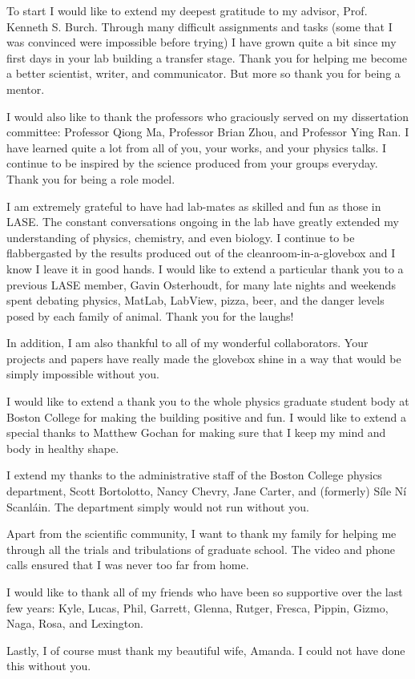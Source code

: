 To start I would like to extend my deepest gratitude to my advisor, Prof. Kenneth S. Burch. Through many difficult assignments and tasks (some that I was convinced were impossible before trying) I have grown quite a bit since my first days in your lab building a transfer stage. Thank you for helping me become a better scientist, writer, and communicator. But more so thank you for being a mentor. \par
I would also like to thank the professors who graciously served on my dissertation committee: Professor Qiong Ma, Professor Brian Zhou, and Professor Ying Ran. I have learned quite a lot from all of you, your works, and your physics talks. I continue to be inspired by the science produced from your groups everyday. Thank you for being a role model.\par
I am extremely grateful to have had lab-mates as skilled and fun as those in LASE. The constant conversations ongoing in the lab have greatly extended my understanding of physics, chemistry, and even biology. I continue to be flabbergasted by the results produced out of the cleanroom-in-a-glovebox and I know I leave it in good hands. I would like to extend a particular thank you to a previous LASE member, Gavin Osterhoudt, for many late nights and weekends spent debating physics, MatLab, LabView, pizza, beer, and the danger levels posed by each family of animal. Thank you for the laughs!\par
In addition, I am also thankful to all of my wonderful collaborators. Your projects and papers have really made the glovebox shine in a way that would be simply impossible without you. \par
I would like to extend a thank you to the whole physics graduate student body at Boston College for making the building positive and fun. I would like to extend a special thanks to Matthew Gochan for making sure that I keep my mind and body in healthy shape. \par
I extend my thanks to the administrative staff of the Boston College physics department, Scott Bortolotto, Nancy Chevry, Jane Carter, and (formerly) S\'{i}le N\'{i} Scanl\'{a}in. The department simply would not run without you.\par
Apart from the scientific community, I want to thank my family for helping me through all the trials and tribulations of graduate school. The video and phone calls ensured that I was never too far from home.\par
I would like to thank all of my friends who have been so supportive over the last few years: Kyle, Lucas, Phil, Garrett, Glenna, Rutger, Fresca, Pippin, Gizmo, Naga, Rosa, and Lexington.\par
Lastly, I of course must thank my beautiful wife, Amanda. I could not have done this without you. 